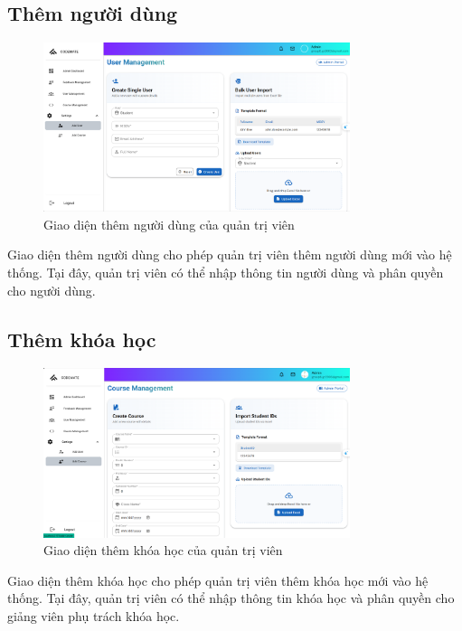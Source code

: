 \subsection{Thêm người dùng}
\begin{figure}[H]
    \centering
    \includegraphics[width=0.8\textwidth]{images/CapScreen_Admin/adduser.png}
    \caption{Giao diện thêm người dùng của quản trị viên}
    \label{fig:admin_add_user_page}
\end{figure}
Giao diện thêm người dùng cho phép quản trị viên thêm người dùng mới vào hệ thống. Tại đây, quản trị viên có thể nhập thông tin người dùng và phân quyền cho người dùng.
\subsection{Thêm khóa học}
\begin{figure}[H]
    \centering
    \includegraphics[width=0.8\textwidth]{images/CapScreen_Admin/addcourse.png}
    \caption{Giao diện thêm khóa học của quản trị viên}
    \label{fig:admin_add_course_page}
\end{figure}
Giao diện thêm khóa học cho phép quản trị viên thêm khóa học mới vào hệ thống. Tại đây, quản trị viên có thể nhập thông tin khóa học và phân quyền cho giảng viên phụ trách khóa học. 